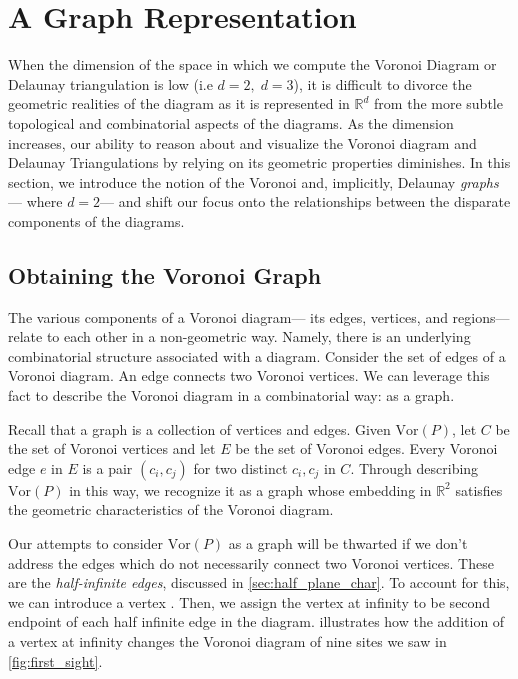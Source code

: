 \documentclass[12pt,twoside]{reedthesis}
\begin{document}
  \section{A Graph Representation} %
  \label{sec:a_graph_rep}

    When the dimension of the space in which we compute the Voronoi Diagram or Delaunay triangulation is low (i.e $d = 2,\; d=3 $), it is difficult to divorce the geometric realities of the diagram as it is represented in $\mathds{R}^d$ from the more subtle topological and combinatorial aspects of the diagrams. As the dimension increases, our ability to reason about and visualize the Voronoi diagram and Delaunay Triangulations by relying on its geometric properties diminishes. In this section, we introduce the notion of the Voronoi and, implicitly, Delaunay \emph{graphs}--- where $d=2$--- and shift our focus onto the relationships between the disparate components of the diagrams.\par

    \subsection{Obtaining the Voronoi Graph} %
    \label{sub:voronoi_graph}

      The various components of a Voronoi diagram--- its edges, vertices, and regions--- relate to each other in a non-geometric way. Namely, there is an underlying combinatorial structure associated with a diagram. Consider the set of edges of a Voronoi diagram. An edge connects two Voronoi vertices. We can leverage this fact to describe the Voronoi diagram in a combinatorial way: as a graph.\par

      Recall that a graph is a collection of vertices and edges. Given $\mbox{Vor}(P)$, let $C$ be the set of Voronoi vertices and let $E$ be the set of Voronoi edges. Every Voronoi edge $e$ in $E$ is a pair $(c_{i}, c_{j})$ for two distinct $c_{i}, c_{j}$  in $C$. Through describing $\mbox{Vor}(P)$ in this way, we recognize it as a graph whose embedding in $\mathds{R}^2$ satisfies the geometric characteristics of the Voronoi diagram.\par

      Our attempts to consider $\mbox{Vor}(P)$ as a graph will be thwarted if we don't address the edges which do not necessarily connect two Voronoi vertices. These are the \emph{half-infinite edges}, discussed in \cref{sec:half_plane_char}. To account for this, we can introduce a vertex . Then, we assign the vertex at infinity to be second endpoint of each half infinite edge in the diagram.  illustrates how the addition of a vertex at infinity changes the Voronoi diagram of nine sites we saw in \cref{fig:first_sight}.\par
\end{document}
